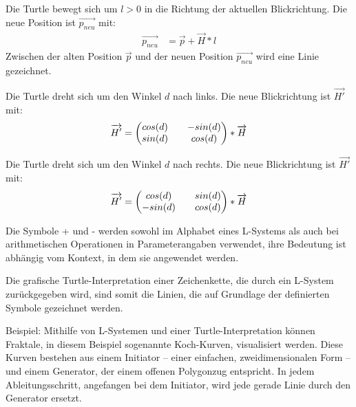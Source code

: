 \begin{description}[labelindent]
	\item[\boldmath$F(l)$] Die Turtle bewegt sich um $l>0$ in die Richtung der aktuellen Blickrichtung. Die neue Position ist  $\overrightarrow{p_{neu}}$ mit:
	\begin{equation}
	\begin{array}{ll}
	\overrightarrow{p_{neu}} & = \overrightarrow{p} + \overrightarrow{H} * l
	\end{array}
	\end{equation} 
	Zwischen der alten Position $\overrightarrow{p}$ und der neuen Position $\overrightarrow{p_{neu}}$ wird eine Linie gezeichnet.\\
	
	\item[\boldmath$+(d)$]  Die Turtle dreht sich um den Winkel $d$ nach links. Die neue Blickrichtung ist $\overrightarrow{H'}$ mit:
	\begin{equation}
	\overrightarrow{H'} = 
	\setlength\arraycolsep{10pt}
	\begin{pmatrix}
	cos(d) & -sin(d)\\
	sin(d) & cos(d)
	\end{pmatrix}
	* \overrightarrow{H}
	\end{equation} 
	
	\item[\boldmath$-(d)$]  Die Turtle dreht sich um den Winkel $d$ nach rechts. Die neue Blickrichtung ist $\overrightarrow{H'}$ mit:
	\begin{equation}
	\overrightarrow{H'} = 
	\setlength\arraycolsep{10pt}
	\begin{pmatrix}
	cos(d) & sin(d)\\
	-sin(d) & cos(d)
	\end{pmatrix}
	* \overrightarrow{H}
	\end{equation} 
	
\end{description}
\cite[S.4,46]{Turtle:04} \cite[S.7]{ABOP:04}
Die Symbole \glqq+\grqq{} und \glqq-\grqq{} werden sowohl im Alphabet eines L-Systems als auch bei arithmetischen Operationen in Parameterangaben verwendet, ihre Bedeutung ist abhängig vom Kontext, in dem sie angewendet werden. \cite[S.46]{ABOP:04}

Die grafische Turtle-Interpretation einer Zeichenkette, die durch ein L-System zurückgegeben wird, sind somit die Linien, die auf Grundlage der definierten Symbole gezeichnet werden. 

Beispiel: Mithilfe von L-Systemen und einer Turtle-Interpretation können Fraktale, in diesem Beispiel sogenannte Koch-Kurven, visualisiert werden. Diese Kurven bestehen aus einem Initiator -- einer einfachen, zweidimensionalen Form -- und einem Generator, der einem offenen Polygonzug entspricht. In jedem Ableitungsschritt, angefangen bei dem Initiator, wird jede gerade Linie durch den Generator ersetzt. \cite[S.39]{Mandelbrot:16} 

